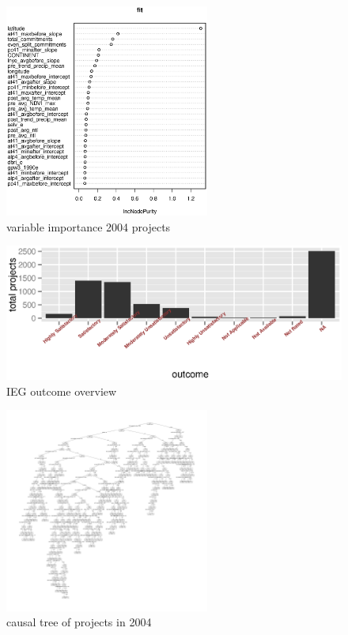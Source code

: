 \begin{figure}
	\centering
	\includegraphics[width=0.6\textwidth]{figs/varimp2004.eps}
	\caption{variable importance 2004 projects}\label{fig:varimp}
\end{figure}

\begin{figure}
	\centering
	\includegraphics[width=\textwidth]{figs/hist_wb.eps}
	\caption{IEG outcome overview}
\end{figure}


 \begin{figure}
 \centering 
 \includegraphics[page=84,width=0.6\textwidth]{figs/project_2004.pdf}
 \caption{causal tree of projects in 2004}\label{fig:ct}
\end{figure}

